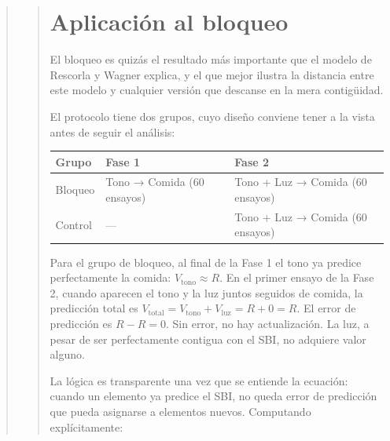 \documentclass[
  letterpaper,
  DIV=11,
  numbers=noendperiod]{scrreprt}
\newcounter{none} %
\begin{document}
\begin{tcolorbox}[enhanced jigsaw, arc=.35mm, bottomrule=.15mm, breakable, colback=white, colframe=quarto-callout-note-color-frame, left=2mm, leftrule=.75mm, opacityback=0, rightrule=.15mm, toprule=.15mm]
\begin{quote}
\begin{quote}
\mbox{}%
\section{Aplicación al bloqueo}\label{aplicaciuxf3n-al-bloqueo}

El bloqueo es quizás el resultado más importante que el modelo de
Rescorla y Wagner explica, y el que mejor ilustra la distancia entre
este modelo y cualquier versión que descanse en la mera contigüidad.

El protocolo tiene dos grupos, cuyo diseño conviene tener a la vista
antes de seguir el análisis:

{\def\LTcaptype{none} %
\begin{longtable}[]{@{}
  >{\raggedright\arraybackslash}p{}
  >{\raggedright\arraybackslash}p{}
  >{\raggedright\arraybackslash}p{}@{}}
\toprule\noalign{}
\begin{minipage}[b]{\linewidth}\raggedright
Grupo
\end{minipage} & \begin{minipage}[b]{\linewidth}\raggedright
Fase 1
\end{minipage} & \begin{minipage}[b]{\linewidth}\raggedright
Fase 2
\end{minipage} \\
\midrule\noalign{}
\endhead
\bottomrule\noalign{}
\endlastfoot
Bloqueo & Tono → Comida (60 ensayos) & Tono + Luz → Comida (60
ensayos) \\
Control & --- & Tono + Luz → Comida (60 ensayos) \\
\end{longtable}
}

Para el grupo de bloqueo, al final de la Fase 1 el tono ya predice
perfectamente la comida: \(V_{\text{tono}} \approx R\). En el primer
ensayo de la Fase 2, cuando aparecen el tono y la luz juntos seguidos de
comida, la predicción total es
\(V_{\text{total}} = V_{\text{tono}} + V_{\text{luz}} = R + 0 = R\). El
error de predicción es \(R - R = 0\). Sin error, no hay actualización.
La luz, a pesar de ser perfectamente contigua con el SBI, no adquiere
valor alguno.

La lógica es transparente una vez que se entiende la ecuación: cuando un
elemento ya predice el SBI, no queda error de predicción que pueda
asignarse a elementos nuevos. Computando explícitamente:


\end{quote}
\end{quote}
\end{tcolorbox}
\end{document}
